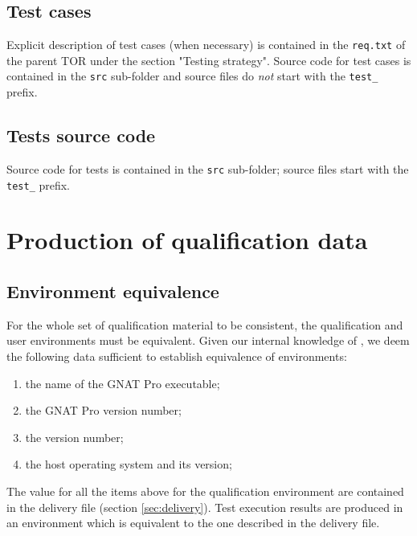 \documentclass {report}
\begin{document}
\subsection{Test cases}
Explicit description of test cases (when necessary) is contained in the \texttt{req.txt} of the parent TOR under the section "Testing strategy". Source code for test cases is contained in the \texttt{src} sub-folder and source files do \emph{not} start with the \texttt{test\_} prefix. 

\subsection{Tests source code}
Source code for tests is contained in the \texttt{src} sub-folder; source files start with the \texttt{test\_} prefix. 

\section{Production of qualification data}

\subsection{Environment equivalence}
\label{sec:equivalence}
For the whole set of qualification material to be consistent, the qualification and user environments must be equivalent. Given our internal knowledge of \xcov{}, we deem the following data sufficient to establish equivalence of environments:
\begin{enumerate}
\item the name of the GNAT Pro executable;
\item the GNAT Pro version number;
\item the \xcov{} version number;
\item the host operating system and its version;
\end{enumerate}
The value for all the items above for the qualification environment are contained in the delivery file (section \ref{sec:delivery}). Test execution results are produced in an environment which is equivalent to the one described in the delivery file. 
\end{document}
